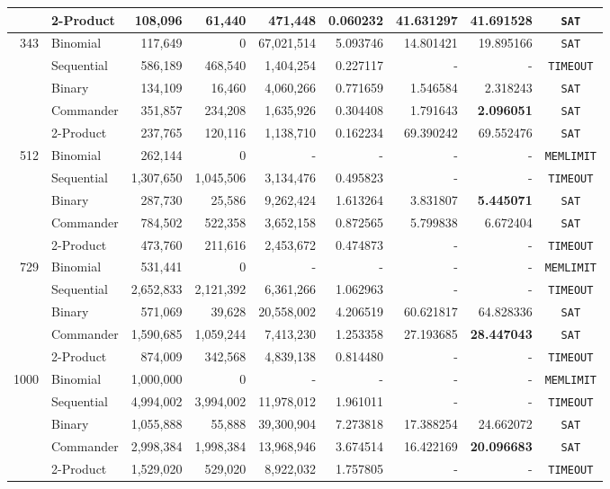 \documentclass[a4paper,fleqn]{cas-sc}
\begin{document}
\begin{table}[t]
\begin{tabular*}{\textwidth}{@{\extracolsep{\fill}} r l r r r r r r c @{}}
 & 2-Product & 108,096 & 61,440 & 471,448 & 0.060232 & 41.631297 & 41.691528 & \texttt{SAT} \\
\midrule
\multirow{5}{*}{343} 
 & Binomial & 117,649 & 0 & 67,021,514 & 5.093746 & 14.801421 & 19.895166 & \texttt{SAT} \\
 & Sequential & 586,189 & 468,540 & 1,404,254 & 0.227117 & - & - & \texttt{TIMEOUT} \\
 & Binary & 134,109 & 16,460 & 4,060,266 & 0.771659 & 1.546584 & 2.318243 & \texttt{SAT} \\
 & Commander & 351,857 & 234,208 & 1,635,926 & 0.304408 & 1.791643 & \textbf{2.096051} & \texttt{SAT} \\
 & 2-Product & 237,765 & 120,116 & 1,138,710 & 0.162234 & 69.390242 & 69.552476 & \texttt{SAT} \\
\midrule
\multirow{5}{*}{512} 
 & Binomial & 262,144 & 0 & - & - & - & - & \texttt{MEMLIMIT} \\
 & Sequential & 1,307,650 & 1,045,506 & 3,134,476 & 0.495823 & - & - & \texttt{TIMEOUT} \\
 & Binary & 287,730 & 25,586 & 9,262,424 & 1.613264 & 3.831807 & \textbf{5.445071} & \texttt{SAT} \\
 & Commander & 784,502 & 522,358 & 3,652,158 & 0.872565 & 5.799838 & 6.672404 & \texttt{SAT} \\
 & 2-Product & 473,760 & 211,616 & 2,453,672 & 0.474873 & - & - & \texttt{TIMEOUT} \\
\midrule
\multirow{5}{*}{729} 
 & Binomial & 531,441 & 0 & - & - & - & - & \texttt{MEMLIMIT} \\
 & Sequential & 2,652,833 & 2,121,392 & 6,361,266 & 1.062963 & - & - & \texttt{TIMEOUT} \\
 & Binary & 571,069 & 39,628 & 20,558,002 & 4.206519 & 60.621817 & 64.828336 & \texttt{SAT} \\
 & Commander & 1,590,685 & 1,059,244 & 7,413,230 & 1.253358 & 27.193685 & \textbf{28.447043} & \texttt{SAT} \\
 & 2-Product & 874,009 & 342,568 & 4,839,138 & 0.814480 & - & - & \texttt{TIMEOUT} \\
\midrule
\multirow{5}{*}{1000} 
 & Binomial & 1,000,000 & 0 & - & - & - & - & \texttt{MEMLIMIT} \\
 & Sequential & 4,994,002 & 3,994,002 & 11,978,012 & 1.961011 & - & - & \texttt{TIMEOUT} \\
 & Binary & 1,055,888 & 55,888 & 39,300,904 & 7.273818 & 17.388254 & 24.662072 & \texttt{SAT} \\
 & Commander & 2,998,384 & 1,998,384 & 13,968,946 & 3.674514 & 16.422169 & \textbf{20.096683} & \texttt{SAT} \\
 & 2-Product & 1,529,020 & 529,020 & 8,922,032 & 1.757805 & - & - & \texttt{TIMEOUT} \\
\bottomrule
\end{tabular*}
\end{table}
\end{document}
